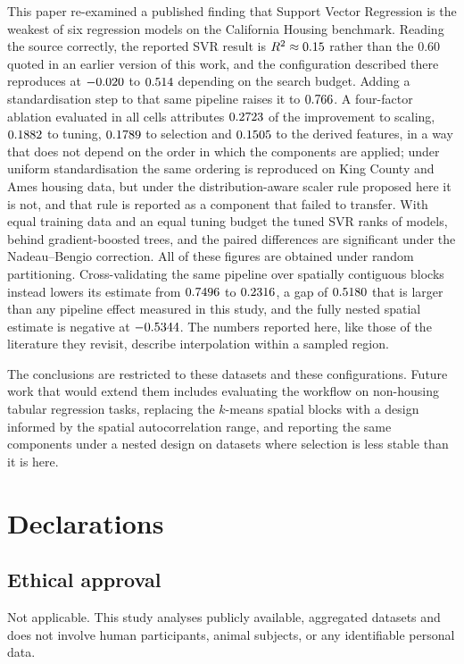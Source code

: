 \documentclass[pdflatex,sn-mathphys-num]{sn-jnl}
\begin{document}
This paper re-examined a published finding that Support Vector Regression is the weakest of six regression models on the California Housing benchmark. Reading the source correctly, the reported SVR result is $R^2 \approx 0.15$ rather than the $0.60$ quoted in an earlier version of this work, and the configuration described there reproduces at $-0.020$ to $0.514$ depending on the search budget. Adding a standardisation step to that same pipeline raises it to $0.766$. A four-factor ablation evaluated in all \AblNcells{} cells attributes $0.2723$ of the improvement to scaling, $0.1882$ to tuning, $0.1789$ to selection and $0.1505$ to the derived features, in a way that does not depend on the order in which the components are applied; under uniform standardisation the same ordering is reproduced on King County and Ames housing data, but under the distribution-aware scaler rule proposed here it is not, and that rule is reported as a component that failed to transfer. With equal training data and an equal tuning budget the tuned SVR ranks \SvrRankFull{} of \NModels{} models, behind gradient-boosted trees, and the paired differences are significant under the Nadeau--Bengio correction. All of these figures are obtained under random partitioning. Cross-validating the same pipeline over spatially contiguous blocks instead lowers its estimate from $0.7496$ to $0.2316$, a gap of $0.5180$ that is larger than any pipeline effect measured in this study, and the fully nested spatial estimate is negative at $-0.5344$. The numbers reported here, like those of the literature they revisit, describe interpolation within a sampled region.

The conclusions are restricted to these datasets and these configurations. Future work that would extend them includes evaluating the workflow on non-housing tabular regression tasks, replacing the $k$-means spatial blocks with a design informed by the spatial autocorrelation range, and reporting the same components under a nested design on datasets where selection is less stable than it is here.

\section*{Declarations}

\subsection*{Ethical approval}
Not applicable. This study analyses publicly available, aggregated datasets and does not involve human participants, animal subjects, or any identifiable personal data.
\end{document}
